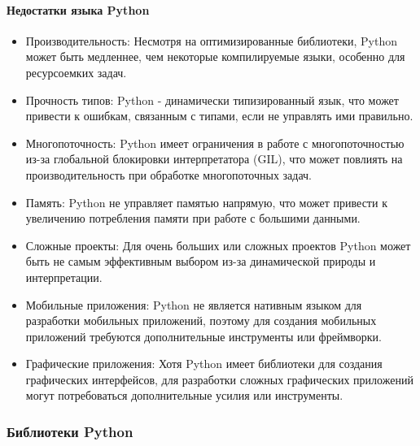 \paragraph{Недостатки языка Python}

\begin{itemize}
\item Производительность: Несмотря на оптимизированные библиотеки, Python может быть медленнее, чем некоторые компилируемые языки, особенно для ресурсоемких задач.
\item Прочность типов: Python - динамически типизированный язык, что может привести к ошибкам, связанным с типами, если не управлять ими правильно.
\item Многопоточность: Python имеет ограничения в работе с многопоточностью из-за глобальной блокировки интерпретатора (GIL), что может повлиять на производительность при обработке многопоточных задач.
\item Память: Python не управляет памятью напрямую, что может привести к увеличению потребления памяти при работе с большими данными.
\item Сложные проекты: Для очень больших или сложных проектов Python может быть не самым эффективным выбором из-за динамической природы и интерпретации.
\item Мобильные приложения: Python не является нативным языком для разработки мобильных приложений, поэтому для создания мобильных приложений требуются дополнительные инструменты или фреймворки.
\item Графические приложения: Хотя Python имеет библиотеки для создания графических интерфейсов, для разработки сложных графических приложений могут потребоваться дополнительные усилия или инструменты.
\end{itemize}

\subsubsection{Библиотеки Python}

